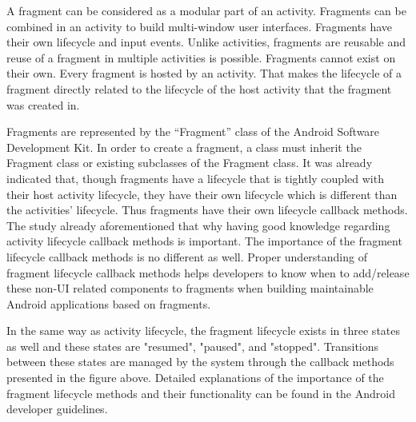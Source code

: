 \FloatBarrier
A fragment can be considered as a modular part of an activity. Fragments can be combined in an activity to build multi-window user interfaces. Fragments have their own lifecycle and input events. Unlike activities, fragments are reusable and reuse of a fragment in multiple activities is possible. Fragments cannot exist on their own. Every fragment is hosted by an activity. That makes the lifecycle of a fragment directly related to the lifecycle of the host activity that the fragment was created in. 

Fragments are represented by the “Fragment” class of the Android Software Development Kit. In order to create a fragment, a class must inherit the Fragment class or existing subclasses of the Fragment class. It was already indicated that, though fragments have a lifecycle that is tightly coupled with their host activity lifecycle, they have their own lifecycle which is different than the activities’ lifecycle. Thus fragments have their own lifecycle callback methods. The study already aforementioned that why having good knowledge regarding activity lifecycle callback methods is important. The importance of the fragment lifecycle callback methods is no different as well. Proper understanding of fragment lifecycle callback methods helps developers to know when to add/release these non-UI related components to fragments when building maintainable Android applications based on fragments.

In the same way as activity lifecycle, the fragment lifecycle exists in three states as well and these states are "resumed", "paused", and "stopped". Transitions between these states are managed by the system through the callback methods presented in the figure above. Detailed explanations of the importance of the fragment lifecycle methods and their functionality can be found in the Android developer guidelines. 